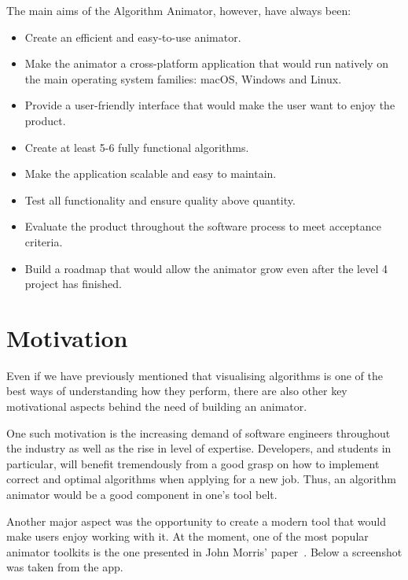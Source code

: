 \documentclass{l4proj}
\begin{document}
The main aims of the Algorithm Animator, however, have always been:
\begin{itemize}
	\item Create an efficient and easy-to-use animator.
	\item Make the animator a cross-platform application that would run natively on the main operating system families: macOS, Windows and Linux.
	\item Provide a user-friendly interface that would make the user want to enjoy the product.
	\item Create at least 5-6 fully functional algorithms.
	\item Make the application scalable and easy to maintain.
	\item Test all functionality and ensure quality above quantity.
	\item Evaluate the product throughout the software process to meet acceptance criteria.
	\item Build a roadmap that would allow the animator grow even after the level 4 project has finished.
\end{itemize}

\section{Motivation}

Even if we have previously mentioned that visualising algorithms is one of the best ways of understanding how they perform, there are also other key motivational aspects behind the need of building an animator.

One such motivation is the increasing demand of software engineers throughout the industry as well as the rise in level of expertise. Developers, and students in particular, will benefit tremendously from a good grasp on how to implement correct and optimal algorithms when applying for a new job. Thus, an algorithm animator would be a good component in one's tool belt.

Another major aspect was the opportunity to create a modern tool that would make users enjoy working with it. At the moment, one of the most popular animator toolkits is the one presented in John Morris' paper~\cite{animator-toolkit}.  Below a screenshot was taken from the app. \newpage
\end{document}
